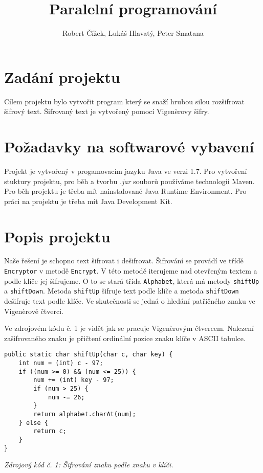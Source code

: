 \documentclass{article}
\title{Paralelní programování}
\author{Robert Čížek, Lukáš Hlavatý, Peter Smatana}
\begin{document}
\maketitle

\section{Zadání projektu}
Cílem projektu bylo vytvořit program který se snaží hrubou silou rozšifrovat šifrový text.
Šifrovaný text je vytvořený pomocí Vigenèrovy šifry.
\newline

\section{Požadavky na softwarové vybavení}
Projekt je vytvořený v progamovacím jazyku Java ve verzi 1.7. Pro vytvoření stuktury projektu,
pro běh a tvorbu \textit{.jar} souborů používáme technologii Maven. Pro běh projektu je třeba
mít nainstalované Java Runtime Environment. Pro práci na projektu je třeba mít Java Development
Kit.
\newline

\section{Popis projektu}
Naše řešení je schopno text šifrovat i dešifrovat. Šifrování se provádí ve třídě
\texttt{Encryptor} v metodě \texttt{Encrypt}. V této metodě iterujeme nad otevřeným textem
a podle klíče jej šifrujeme. O to se stará třída \texttt{Alphabet}, která má metody
\texttt{shiftUp} a \texttt{shiftDown}. Metoda \texttt{shiftUp} šifruje text podle klíče
a metoda \texttt{shiftDown} dešifruje text podle klíče. Ve skutečnosti se jedná o hledání
patřičného znaku ve Vigenèrově čtverci.

Ve zdrojovém kódu č. 1 je vidět jak se pracuje Vigenèrovým čtvercem. Nalezení zašifrovaného znaku
je přičtení ordinální pozice znaku klíče v ASCII tabulce.

\begin{center}
\begin{lstlisting}
public static char shiftUp(char c, char key) {
	int num = (int) c - 97;
	if ((num >= 0) && (num <= 25)) {
		num += (int) key - 97;
		if (num > 25) {
			num -= 26;
		}
		return alphabet.charAt(num);
	} else {
		return c;
	}
}
\end{lstlisting}
\vspace{1mm}
\textit{Zdrojový kód č. 1: Šifrování znaku podle znaku v klíči.}
\end{center}
\end{document}
